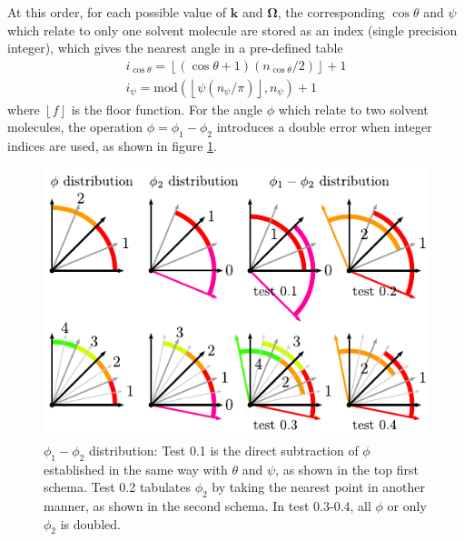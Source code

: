 At this order, for each possible value of $\mathbf{k}$ and $\mathbf{\Omega}$,
the corresponding $\cos\theta$ and $\psi$ which relate to only one
solvent molecule are stored as an index (single precision integer),
which gives the nearest angle in a pre-defined table
\begin{equation}
\begin{array}{l}
i_{\cos\theta}=\left\lfloor (\cos\theta+1)(n_{\cos\theta}/2)\right\rfloor +1\\
i_{\psi}=\mathrm{mod}(\left\lfloor \psi(n_{\psi}/\pi)\right\rfloor ,n_{\psi})+1
\end{array}
\end{equation}
where $\left\lfloor f\right\rfloor $ is the floor function. For the
angle $\phi$ which relate to two solvent molecules, the operation
$\phi=\phi_{1}-\phi_{2}$ introduces a double error when integer indices
are used, as shown in figure \ref{fig:diff_phi}.

\begin{figure}[h]
\begin{centering}
\includegraphics{_figure/diff_phi}
\par\end{centering}

\caption[$\phi_{1}-\phi_{2}$ distribution]{$\phi_{1}-\phi_{2}$ distribution: Test 0.1 is the direct subtraction
of $\phi$ established in the same way with $\theta$ and $\psi$,
as shown in the top first schema. Test 0.2 tabulates $\phi_{2}$ by
taking the nearest point in another manner, as shown in the second
schema. In test 0.3-0.4, all $\phi$ or only $\phi_{2}$ is doubled.\label{fig:diff_phi}}
\end{figure}


